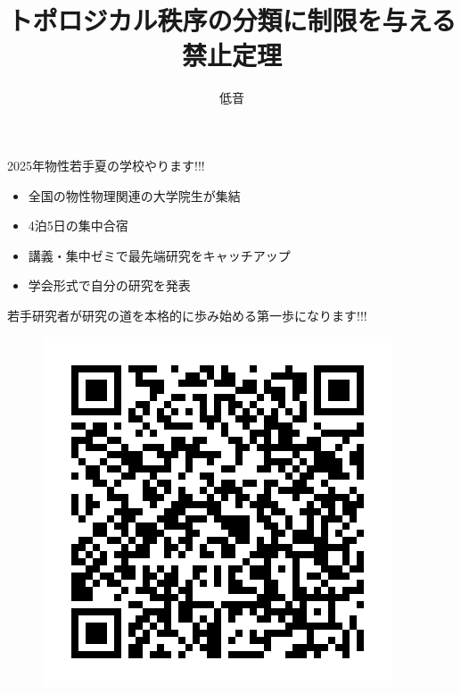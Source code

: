 \documentclass[dvipdfm]{beamer}
\title{トポロジカル秩序の分類に制限を与える禁止定理}
\author{低音}
\begin{document}
\begin{frame}
    \titlepage
\end{frame}

\begin{frame}{2025年物性若手夏の学校やります!!!}
    \begin{itemize}
        \item 全国の物性物理関連の大学院生が集結
        \item 4泊5日の集中合宿
        \item 講義・集中ゼミで最先端研究をキャッチアップ
        \item 学会形式で自分の研究を発表
    \end{itemize}
    若手研究者が研究の道を本格的に歩み始める第一歩になります!!!

    \textbf{}

    \textbf{}
    \begin{figure}
        \centering
        \includegraphics[width=0.2\linewidth]{QR_992675.png}
    \end{figure}
\end{frame}
\end{document}
